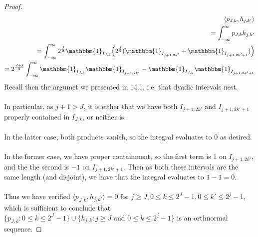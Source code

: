 \documentclass[12pt]{article}
\newenvironment{ex}[2][Exercise]{\begin{trivlist}
\item[\hskip \labelsep {\bfseries #1}\hskip \labelsep {\bfseries #2.}]}{\end{trivlist}}
\begin{document}
\begin{ex}{14}
\begin{enumerate}[label=14.\arabic*]
\begin{proof}
\begin{align*}
                \langle p_{J,k}, h_{j, k'} \rangle \\
                = \int_{-\infty}^\infty p_{J,k}h_{j,k'} \\
                = \int_{-\infty}^\infty 2^{\frac{J}{2}}\mathbbm{1}_{I_{J,k}} \Big (2^{\frac{j}{2}}(\mathbbm{1}_{I_{j + 1, 2k'}} + \mathbbm{1}_{I_{j + 1, 2k' + 1}}) \Big) \\
                = 2^\frac{J + j}{2} \int_{-\infty}^\infty \mathbbm{1}_{I_{J, k}}\mathbbm{1}_{I_{j + 1, 2k'}} - \mathbbm{1}_{I_{J,k}}\mathbbm{1}_{I_{j + 1, 2k' + 1}}
            \end{align*}
            Recall then the argumet we presented in 14.1, i.e. that dyadic intervals nest. \\ \\
            In particular, as $j + 1 > J$, it is either that we have both $I_{j + 1, 2k'}$ and $I_{j + 1, 2k' + 1}$ properly contained in $I_{J,k}$, or neither is. \\ \\
            In the latter case, both products vanish, so the integral evaluates to 0 as desired. \\ \\
            In the former case, we have proper containment, so the first term is $1$ on $I_{j + 1, 2k'}$, and the the second is $-1$ on $I_{j + 1, 2k' + 1}$. Then as both these intervals are the same length (and disjoint), we have that the integral evaluates to $1 - 1 = 0$. \\ \\
            Thus we have verified  $\langle p_{J,k}, h_{j,k'} \rangle = 0$ for $j \geq J, 0 \leq k \leq 2^J - 1, 0 \leq k' \leq 2^j - 1$, which is sufficient to conclude that $\{p_{J,k} : 0 \leq k \leq 2^J - 1\} \cup \{h_{j, k} : j \geq J \text{ and } 0 \leq k \leq 2^j - 1\}$ is an orthnormal sequence.


\end{proof}
\end{enumerate}
\end{ex}
\end{document}
